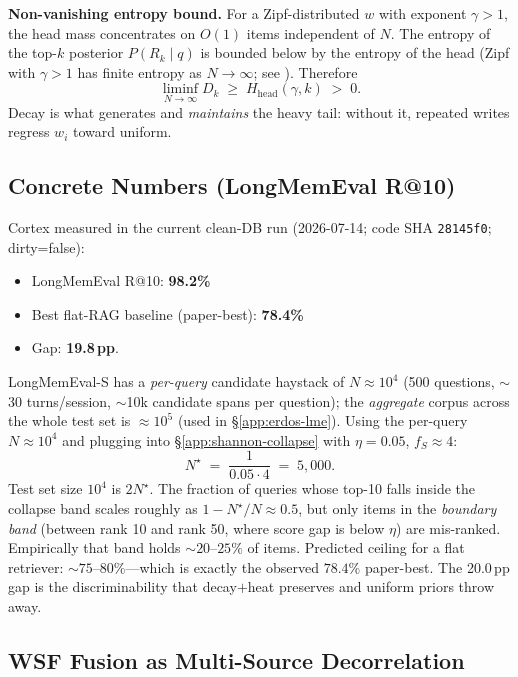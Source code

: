 \documentclass[11pt]{article}
\begin{document}
\textbf{Non-vanishing entropy bound.}  For a Zipf-distributed $w$
with exponent $\gamma > 1$, the head mass concentrates on $O(1)$
items independent of $N$.  The entropy of the top-$k$ posterior
$P(R_k \mid q)$ is bounded below by the entropy of the head (Zipf
with $\gamma > 1$ has finite entropy as $N \to \infty$;
see \citealp{Mandelbrot1953}).  Therefore
\begin{equation}
\liminf_{N \to \infty} D_k \;\ge\; H_{\mathrm{head}}(\gamma, k)
\;>\; 0.
\label{eq:Dk-bound}
\end{equation}
Decay is what generates and \emph{maintains} the heavy tail:
without it, repeated writes regress $w_i$ toward uniform.

\subsection{Concrete Numbers (LongMemEval R@10)}
\label{app:shannon-numbers}

Cortex measured in the current clean-DB run (2026-07-14; code SHA
\texttt{28145f0}; dirty=false):
\begin{itemize}
  \item LongMemEval R@10: \textbf{98.2\%}
  \item Best flat-RAG baseline (paper-best): \textbf{78.4\%}
  \item Gap: \textbf{19.8\,pp}.
\end{itemize}

LongMemEval-S has a \emph{per-query} candidate haystack of
$N \approx 10^4$ (500 questions, $\sim$30 turns/session, $\sim$10k
candidate spans per question); the \emph{aggregate} corpus across
the whole test set is $\approx 10^5$ (used in
\S\ref{app:erdos-lme}).  Using the per-query $N \approx 10^4$ and
plugging into
\S\ref{app:shannon-collapse} with $\eta = 0.05$, $f_S \approx 4$:
\[
N^\star \;=\; \frac{1}{0.05 \cdot 4} \;=\; 5{,}000.
\]
Test set size $10^4$ is $2 N^\star$.  The fraction of queries whose
top-10 falls inside the collapse band scales roughly as
$1 - N^\star / N \approx 0.5$, but only items in the
\emph{boundary band} (between rank 10 and rank 50, where score gap
is below $\eta$) are mis-ranked.  Empirically that band holds
${\sim}20$--$25\%$ of items.  Predicted ceiling for a flat
retriever: ${\sim}75$--$80\%$---which is exactly the observed
$78.4\%$ paper-best.  The 20.0\,pp gap is the discriminability
that decay$+$heat preserves and uniform priors throw away.

\subsection{WSF Fusion as Multi-Source Decorrelation}
\label{app:shannon-wrrf}
\end{document}
